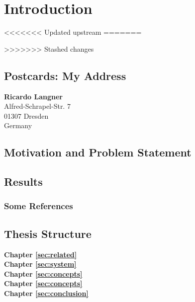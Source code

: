 %
\chapter{Introduction}
\label{sec:intro}


<<<<<<< Updated upstream
=======

>>>>>>> Stashed changes

\section{Postcards: My Address}
\label{sec:intro:address}

\textbf{Ricardo Langner} \\
Alfred-Schrapel-Str. 7 \\
01307 Dresden \\
Germany


\section{Motivation and Problem Statement}
\label{sec:intro:motivation}



\section{Results}
\label{sec:intro:results}



\subsection{Some References}
\label{sec:intro:results:refs}
\cite{WEB:GNU:GPL:2010,WEB:Miede:2011}

\section{Thesis Structure}
\label{sec:intro:structure}

\textbf{Chapter \ref{sec:related}} \\[0.2em]


\textbf{Chapter \ref{sec:system}} \\[0.2em]


\textbf{Chapter \ref{sec:concepts}} \\[0.2em]


\textbf{Chapter \ref{sec:concepts}} \\[0.2em]


\textbf{Chapter \ref{sec:conclusion}} \\[0.2em]

